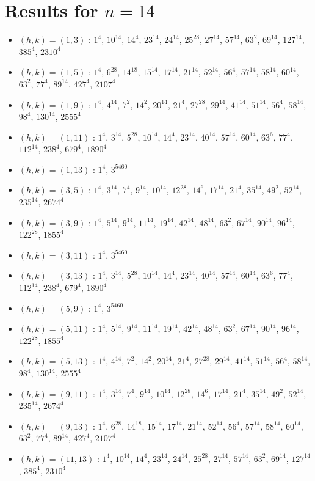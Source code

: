 \section{Results for $n=14$}
\begin{itemize}
\item $(h,k)=(1,3)$ : $1^{4}$, $10^{14}$, $14^{4}$, $23^{14}$, $24^{14}$, $25^{28}$, $27^{14}$, $57^{14}$, $63^{2}$, $69^{14}$, $127^{14}$, $385^{4}$, $2310^{4}$
\item $(h,k)=(1,5)$ : $1^{4}$, $6^{28}$, $14^{18}$, $15^{14}$, $17^{14}$, $21^{14}$, $52^{14}$, $56^{4}$, $57^{14}$, $58^{14}$, $60^{14}$, $63^{2}$, $77^{4}$, $89^{14}$, $427^{4}$, $2107^{4}$
\item $(h,k)=(1,9)$ : $1^{4}$, $4^{14}$, $7^{2}$, $14^{2}$, $20^{14}$, $21^{4}$, $27^{28}$, $29^{14}$, $41^{14}$, $51^{14}$, $56^{4}$, $58^{14}$, $98^{4}$, $130^{14}$, $2555^{4}$
\item $(h,k)=(1,11)$ : $1^{4}$, $3^{14}$, $5^{28}$, $10^{14}$, $14^{4}$, $23^{14}$, $40^{14}$, $57^{14}$, $60^{14}$, $63^{6}$, $77^{4}$, $112^{14}$, $238^{4}$, $679^{4}$, $1890^{4}$
\item $(h,k)=(1,13)$ : $1^{4}$, $3^{5460}$
\item $(h,k)=(3,5)$ : $1^{4}$, $3^{14}$, $7^{4}$, $9^{14}$, $10^{14}$, $12^{28}$, $14^{6}$, $17^{14}$, $21^{4}$, $35^{14}$, $49^{2}$, $52^{14}$, $235^{14}$, $2674^{4}$
\item $(h,k)=(3,9)$ : $1^{4}$, $5^{14}$, $9^{14}$, $11^{14}$, $19^{14}$, $42^{14}$, $48^{14}$, $63^{2}$, $67^{14}$, $90^{14}$, $96^{14}$, $122^{28}$, $1855^{4}$
\item $(h,k)=(3,11)$ : $1^{4}$, $3^{5460}$
\item $(h,k)=(3,13)$ : $1^{4}$, $3^{14}$, $5^{28}$, $10^{14}$, $14^{4}$, $23^{14}$, $40^{14}$, $57^{14}$, $60^{14}$, $63^{6}$, $77^{4}$, $112^{14}$, $238^{4}$, $679^{4}$, $1890^{4}$
\item $(h,k)=(5,9)$ : $1^{4}$, $3^{5460}$
\item $(h,k)=(5,11)$ : $1^{4}$, $5^{14}$, $9^{14}$, $11^{14}$, $19^{14}$, $42^{14}$, $48^{14}$, $63^{2}$, $67^{14}$, $90^{14}$, $96^{14}$, $122^{28}$, $1855^{4}$
\item $(h,k)=(5,13)$ : $1^{4}$, $4^{14}$, $7^{2}$, $14^{2}$, $20^{14}$, $21^{4}$, $27^{28}$, $29^{14}$, $41^{14}$, $51^{14}$, $56^{4}$, $58^{14}$, $98^{4}$, $130^{14}$, $2555^{4}$
\item $(h,k)=(9,11)$ : $1^{4}$, $3^{14}$, $7^{4}$, $9^{14}$, $10^{14}$, $12^{28}$, $14^{6}$, $17^{14}$, $21^{4}$, $35^{14}$, $49^{2}$, $52^{14}$, $235^{14}$, $2674^{4}$
\item $(h,k)=(9,13)$ : $1^{4}$, $6^{28}$, $14^{18}$, $15^{14}$, $17^{14}$, $21^{14}$, $52^{14}$, $56^{4}$, $57^{14}$, $58^{14}$, $60^{14}$, $63^{2}$, $77^{4}$, $89^{14}$, $427^{4}$, $2107^{4}$
\item $(h,k)=(11,13)$ : $1^{4}$, $10^{14}$, $14^{4}$, $23^{14}$, $24^{14}$, $25^{28}$, $27^{14}$, $57^{14}$, $63^{2}$, $69^{14}$, $127^{14}$, $385^{4}$, $2310^{4}$
\end{itemize}
